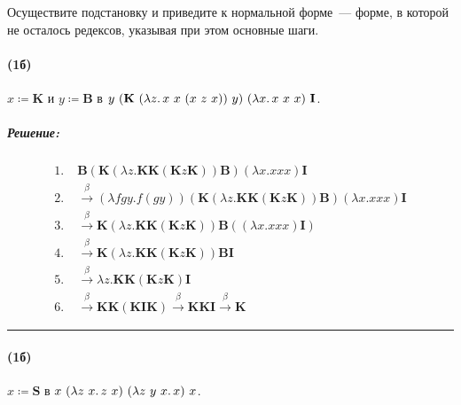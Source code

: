 \documentclass{article}
\newenvironment{proof}{\subparagraph{\hspace{-1em}Решение:\newline}}{\par\noindent\rule{\textwidth}{0.4pt}}
\newcommand{\comb}[1]{\mathbf{#1}}
\newcommand{\termdef}{\coloneqq}
\begin{document}
    \subsubsection{}

    Осуществите подстановку и приведите к нормальной форме~--- форме, в которой не осталось редексов, указывая при этом основные шаги.

    \paragraph{(1б)}

    $x \termdef \comb{K}$ и $y \termdef \comb{B}$ в $y~(\comb{K}~(\lambda z\ldotp x~x~(x~z~x))~y)~(\lambda x\ldotp x~x~x)~\comb{I}$.

    \begin{proof}
        \[
            \begin{aligned}
                \text{1.} \;& \mathbf{B} (\mathbf{K} (\lambda z. \mathbf{K} \mathbf{K} (\mathbf{K} z \mathbf{K})) \mathbf{B}) (\lambda x. x x x) \mathbf{I} \\[1mm]
                \text{2.} \;& \xrightarrow{\beta} (\lambda f g y. f (g y)) (\mathbf{K} (\lambda z. \mathbf{K} \mathbf{K} (\mathbf{K} z \mathbf{K})) \mathbf{B}) (\lambda x. x x x) \mathbf{I} \\[1mm]
                \text{3.} \;& \xrightarrow{\beta} \mathbf{K} (\lambda z. \mathbf{K} \mathbf{K} (\mathbf{K} z \mathbf{K})) \mathbf{B} ((\lambda x. x x x) \mathbf{I}) \\[1mm]
                \text{4.} \;& \xrightarrow{\beta} \mathbf{K} (\lambda z. \mathbf{K} \mathbf{K} (\mathbf{K} z \mathbf{K})) \mathbf{B} \mathbf{I} \\[1mm]
                \text{5.} \;& \xrightarrow{\beta} \lambda z. \mathbf{K} \mathbf{K} (\mathbf{K} z \mathbf{K}) \mathbf{I} \\[1mm]
                \text{6.} \;& \xrightarrow{\beta} \mathbf{K} \mathbf{K} (\mathbf{K} \mathbf{I} \mathbf{K}) \xrightarrow{\beta} \mathbf{K} \mathbf{K} \mathbf{I} \xrightarrow{\beta} \mathbf{K}
            \end{aligned}
        \]
    \end{proof}

    \paragraph{(1б)}

    $x \termdef \comb{S}$ в $x~(\lambda z~x\ldotp z~x)~(\lambda z~y~x\ldotp x)~x$.
\end{document}
